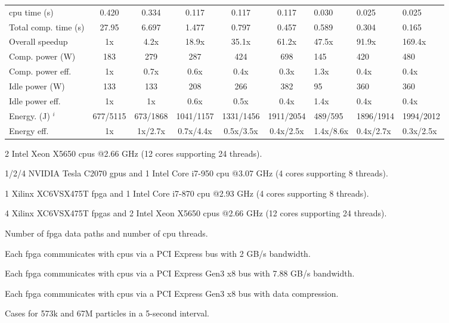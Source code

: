 \begin{table}[ht]
\begin{spacing}{1.0}
\begin{threeparttable}
\begin{tabular}{l || c c c c c g g g}
		\gls{cpu} time (s)							& 0.420							& 0.334						& 0.117						& 0.117						& 0.117						& 0.030		& 0.025		& 0.025		\\
		Total comp. time (s)  					& 27.95							& 6.697 					& 1.477						& 0.797						& 0.457						& 0.589 	& 0.304		& 0.165 	\\
		Overall speedup  						& 1x							& 4.2x	 					& 18.9x						& 35.1x						& 61.2x						& 47.5x 	& 91.9x		& 169.4x	\\
		\hline
		Comp. power (W) 	   					& 183							& 279 						& 287  						& 424						& 698						& 145 		& 420		& 480		\\
		Comp. power eff.						& 1x							& 0.7x						& 0.6x 						& 0.4x						& 0.3x						& 1.3x 		& 0.4x 		& 0.4x		\\
		Idle power (W)    						& 133							& 133						& 208   					& 266 						& 382						& 95		& 360		& 360		\\
		Idle power eff.					    	& 1x							& 1x						& 0.6x	 					& 0.5x						& 0.4x						& 1.4x 	& 0.4x		& 0.4x		\\
		\hline
		Energy. (J) $^i$						& 677/5115						& 673/1868 					& 1041/1157 				& 1331/1456					& 1911/2054					& 489/595 	& 1896/1914	& 1994/2012	\\
		Energy eff.								& 1x							& 1x/2.7x 					& 0.7x/4.4x 				& 0.5x/3.5x 				& 0.4x/2.5x					& 1.4x/8.6x	& 0.4x/2.7x	& 0.3x/2.5x\\
		\hline
		\end{tabular}
			\begin{tablenotes}
			\item[a] 2 Intel Xeon X5650 \glspl{cpu} @2.66 GHz (12 cores supporting 24 threads).
			\item[b] 1/2/4 NVIDIA Tesla C2070 \gls{gpu}s and 1 Intel Core i7-950 \gls{cpu} @3.07 GHz (4 cores supporting 8 threads).
			\item[c] 1 Xilinx XC6VSX475T \gls{fpga} and 1 Intel Core i7-870 \gls{cpu} @2.93 GHz (4 cores supporting 8 threads).
			\item[d] 4 Xilinx XC6VSX475T \glspl{fpga} and 2 Intel Xeon X5650 \glspl{cpu} @2.66 GHz (12 cores supporting 24 threads).
			\item[e] Number of \gls{fpga} data paths and number of \gls{cpu} threads.
			\item[f] Each \gls{fpga} communicates with \glspl{cpu} via a PCI Express bus with 2 GB/s bandwidth.
			\item[g] Each \gls{fpga} communicates with \glspl{cpu} via a PCI Express Gen3 x8 bus with 7.88 GB/s bandwidth.
			\item[h] Each \gls{fpga} communicates with \glspl{cpu} via a PCI Express Gen3 x8 bus with data compression.
			\item[i] Cases for 573k and 67M particles in a 5-second interval.
			\end{tablenotes}
		\end{threeparttable}
\end{spacing}
\end{table}

